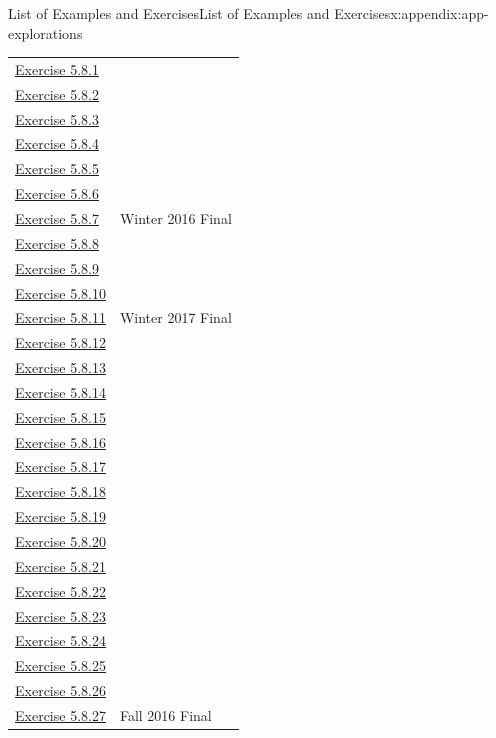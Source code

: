 \documentclass[oneside,10pt,]{book}
\numberwithin{equation}{section}
\begin{document}
\begin{appendixptx}{List of Examples and Exercises}{}{List of Examples and Exercises}{}{}{x:appendix:app-explorations}
\begin{longtable}[l]{ll}
\hyperlink{g:exercise:id490816}{Exercise 5.8.1}& \\
\hyperlink{g:exercise:id490810}{Exercise 5.8.2}& \\
\hyperlink{g:exercise:id494854}{Exercise 5.8.3}& \\
\hyperlink{g:exercise:id494869}{Exercise 5.8.4}& \\
\hyperlink{g:exercise:id494894}{Exercise 5.8.5}& \\
\hyperlink{g:exercise:id494917}{Exercise 5.8.6}& \\
\hyperlink{g:exercise:id494924}{Exercise 5.8.7}& Winter 2016 Final\\
\hyperlink{g:exercise:id494904}{Exercise 5.8.8}& \\
\hyperlink{g:exercise:id494954}{Exercise 5.8.9}& \\
\hyperlink{g:exercise:id494968}{Exercise 5.8.10}& \\
\hyperlink{g:exercise:id494950}{Exercise 5.8.11}& Winter 2017 Final\\
\hyperlink{g:exercise:id494995}{Exercise 5.8.12}& \\
\hyperlink{g:exercise:id494982}{Exercise 5.8.13}& \\
\hyperlink{g:exercise:id495016}{Exercise 5.8.14}& \\
\hyperlink{g:exercise:id495034}{Exercise 5.8.15}& \\
\hyperlink{g:exercise:id495043}{Exercise 5.8.16}& \\
\hyperlink{x:exercise:ex-any-isomorphic}{Exercise 5.8.17}& \\
\hyperlink{x:exercise:ex-complement-deg-sequence}{Exercise 5.8.18}& \\
\hyperlink{g:exercise:id495124}{Exercise 5.8.19}& \\
\hyperlink{g:exercise:id495094}{Exercise 5.8.20}& \\
\hyperlink{g:exercise:id495151}{Exercise 5.8.21}& \\
\hyperlink{g:exercise:id495141}{Exercise 5.8.22}& \\
\hyperlink{x:exercise:ex-path-transitive}{Exercise 5.8.23}& \\
\hyperlink{x:exercise:ex-connectedness-relation}{Exercise 5.8.24}& \\
\hyperlink{g:exercise:id495222}{Exercise 5.8.25}& \\
\hyperlink{g:exercise:id495256}{Exercise 5.8.26}& \\
\hyperlink{x:exercise:ex-deg-connected}{Exercise 5.8.27}& Fall 2016 Final\\

\end{longtable}
\end{appendixptx}
\end{document}
